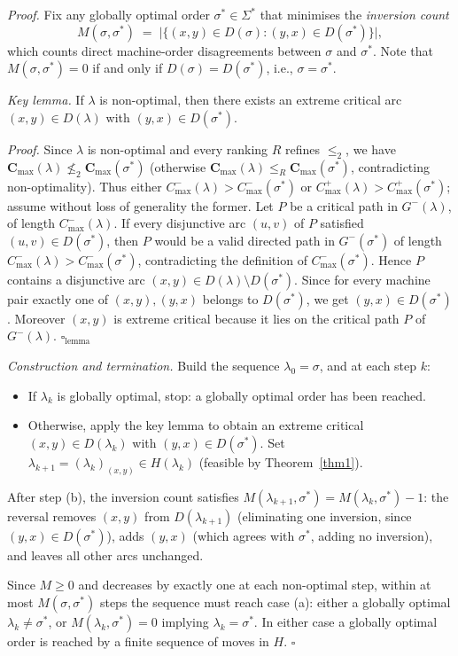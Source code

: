 \documentclass[preprint,12pt]{elsarticle}
\newenvironment{proof}%
  {\noindent\textit{Proof.}\enspace}%
  {\hfill$\square$\par\medskip}
\begin{document}
\begin{proof}
Fix any globally optimal order $\sigma^*\in\Sigma^*$ that minimises the \emph{inversion count}
\[
  M(\sigma,\sigma^*) \;=\; \bigl|\{(x,y)\in D(\sigma) : (y,x)\in D(\sigma^*)\}\bigr|,
\]
which counts direct machine-order disagreements between $\sigma$ and $\sigma^*$.
Note that $M(\sigma,\sigma^*)=0$ if and only if $D(\sigma)=D(\sigma^*)$, i.e., $\sigma=\sigma^*$.

\medskip
\noindent\textit{Key lemma.}
If $\lambda$ is non-optimal, then there exists an extreme critical arc $(x,y)\in D(\lambda)$ with $(y,x)\in D(\sigma^*)$.

\noindent\textit{Proof.}
Since $\lambda$ is non-optimal and every ranking $R$ refines $\le_2$, we have
$\mathbf{C}_{\max}(\lambda)\not\le_2 \mathbf{C}_{\max}(\sigma^*)$
(otherwise $\mathbf{C}_{\max}(\lambda)\le_R\mathbf{C}_{\max}(\sigma^*)$, contradicting non-optimality).
Thus either $C_{\max}^-(\lambda)>C_{\max}^-(\sigma^*)$ or $C_{\max}^+(\lambda)>C_{\max}^+(\sigma^*)$;
assume without loss of generality the former.
Let $P$ be a critical path in $G^-(\lambda)$, of length $C_{\max}^-(\lambda)$.
If every disjunctive arc $(u,v)$ of $P$ satisfied $(u,v)\in D(\sigma^*)$, then $P$ would be a valid directed path in $G^-(\sigma^*)$ of length $C_{\max}^-(\lambda)>C_{\max}^-(\sigma^*)$, contradicting the definition of $C_{\max}^-(\sigma^*)$.
Hence $P$ contains a disjunctive arc $(x,y)\in D(\lambda)\setminus D(\sigma^*)$.
Since for every machine pair exactly one of $(x,y),(y,x)$ belongs to $D(\sigma^*)$, we get $(y,x)\in D(\sigma^*)$.
Moreover $(x,y)$ is extreme critical because it lies on the critical path $P$ of $G^-(\lambda)$. \hfill$\square_{\text{lemma}}$

\medskip
\noindent\textit{Construction and termination.}
Build the sequence $\lambda_0=\sigma$, and at each step $k$:
\begin{itemize}
\item[(a)] If $\lambda_k$ is globally optimal, stop: a globally optimal order has been reached.
\item[(b)] Otherwise, apply the key lemma to obtain an extreme critical $(x,y)\in D(\lambda_k)$ with $(y,x)\in D(\sigma^*)$.
Set $\lambda_{k+1}=(\lambda_k)_{(x,y)}\in H(\lambda_k)$ (feasible by Theorem~\ref{thm1}).
\end{itemize}
After step (b), the inversion count satisfies $M(\lambda_{k+1},\sigma^*)=M(\lambda_k,\sigma^*)-1$:
the reversal removes $(x,y)$ from $D(\lambda_{k+1})$ (eliminating one inversion, since $(y,x)\in D(\sigma^*)$),
adds $(y,x)$ (which agrees with $\sigma^*$, adding no inversion),
and leaves all other arcs unchanged.

Since $M\ge 0$ and decreases by exactly one at each non-optimal step, within at most $M(\sigma,\sigma^*)$ steps the sequence must reach case (a): either a globally optimal $\lambda_k\ne\sigma^*$,
or $M(\lambda_k,\sigma^*)=0$ implying $\lambda_k=\sigma^*$.
In either case a globally optimal order is reached by a finite sequence of moves in $H$.
\end{proof}
\end{document}
